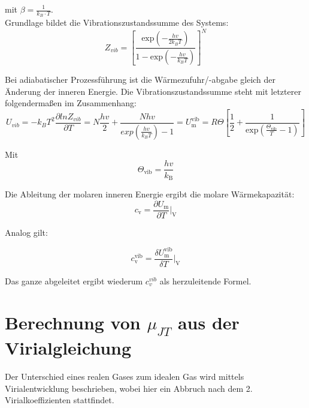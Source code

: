 \documentclass[a4paper,12pt,oneside,onecolum,final,openany]{report}
\begin{document}
mit $\beta=\frac{1}{k_{B} \cdot T}$.\\

Grundlage bildet die Vibrationszustandssumme des Systems:\\

\begin{equation}
Z_{vib}= \left[\frac{\mathrm{exp}(-\frac{hv}{2k_BT})}{1-\mathrm{exp}(-\frac{hv}{k_BT})}\right]^N
\end{equation}

Bei adiabatischer Prozessführung ist die Wärmezufuhr/-abgabe gleich der Änderung der inneren Energie. Die Vibrationszustandssumme steht mit letzterer folgendermaßen im Zusammenhang:\\

\begin{equation}
U_{vib}= -k_BT^2 \frac{\partial lnZ_{vib}}{\partial T} = N\frac{hv}{2} +\frac{Nhv}{exp\left(\frac{hv}{k_BT}\right)-1}= U_\mathrm{m}^\mathrm{vib} = R \Theta \left[ \frac{1}{2} + \frac{1}{\mathrm{exp}(\frac{\Theta_\mathrm{vib}}{T} -1)}\right]
\end{equation}

Mit\\

\begin{equation}
\Theta_\mathrm{vib} = \frac{hv}{k_\mathrm{B}}
\end{equation}


Die Ableitung der molaren inneren Energie ergibt die molare Wärmekapazität:\\


\begin{equation}
c_\mathrm{v} = \frac{\partial U_\mathrm{m}}{\partial T}\bigg \vert_\mathrm{V}
\end{equation}

Analog gilt:

\begin{equation}
c_\mathrm{v}^\mathrm{vib} = \frac{\delta U_\mathrm{m}^\mathrm{vib}}{\delta T}\bigg \vert_\mathrm{V}
\end{equation}

Das ganze abgeleitet ergibt wiederum $c_v^{vib}$ als herzuleitende Formel.\\


\section{Berechnung von $\mu_{JT}$ aus der Virialgleichung}

Der Unterschied eines realen Gases zum idealen Gas wird mittels Virialentwicklung beschrieben, wobei hier ein Abbruch nach dem 2. Virialkoeffizienten stattfindet.\\
\end{document}
